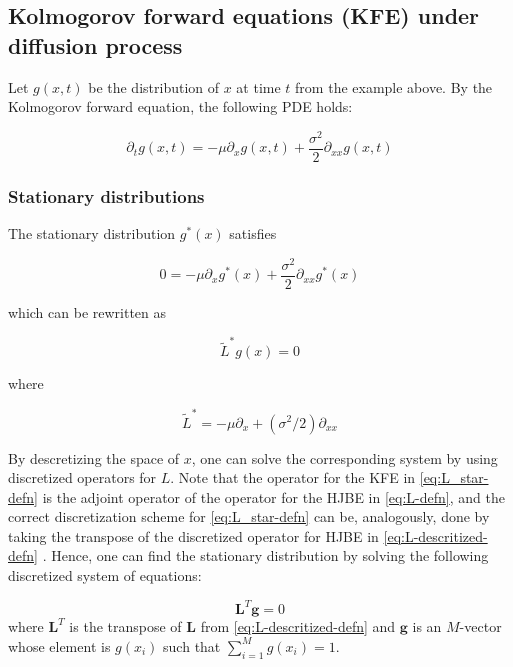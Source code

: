 \documentclass[11pt]{article}
\begin{document}
\subsection{Kolmogorov forward equations (KFE) under diffusion process}
Let $g(x, t)$ be the distribution of $x$ at time $t$ from the example above. By the Kolmogorov forward equation, the following PDE holds:

\begin{equation}\label{eq:kfe}
\partial_{t} g(x, t) = - \mu \partial_{x}  g(x,t) + \dfrac{\sigma^2}{2} \partial_{xx} g(x,t)
\end{equation}

\subsubsection{Stationary distributions}
The stationary distribution $g^*(x)$ satisfies

\begin{equation}\label{eq:kfe-stationary}
0 = - \mu \partial_{x} g^*(x) + \dfrac{\sigma^2}{2} \partial_{xx} g^*(x)
\end{equation}

which can be rewritten as 

\begin{equation}
\tilde{L}^* g(x) = 0
\end{equation}

where 

\begin{equation}\label{eq:L_star-defn}
\tilde{L}^* =  - \mu \partial_{x} + (\sigma^2/2) \partial_{xx}
\end{equation}

By descretizing the space of $x$, one can solve the corresponding system by using discretized operators for $L$. Note that the operator for the KFE in \eqref{eq:L_star-defn} is the adjoint operator of the operator for the HJBE in \eqref{eq:L-defn}, and the correct discretization scheme for \eqref{eq:L_star-defn} can be, analogously, done by taking the transpose of the discretized operator for HJBE in \eqref{eq:L-descritized-defn} \cite{gabaix16}. Hence, one can find the stationary distribution by solving the following discretized system of equations:

\begin{equation}
\mathbf{L}^T \mathbf{g} = 0 
\end{equation}
where $\mathbf{L}^T$ is the transpose of $\mathbf{L}$ from \eqref{eq:L-descritized-defn} and $\mathbf{g}$ is an $M$-vector whose element is $g(x_i)$ such that $\sum_{i=1}^M g(x_i) = 1$.
\end{document}
